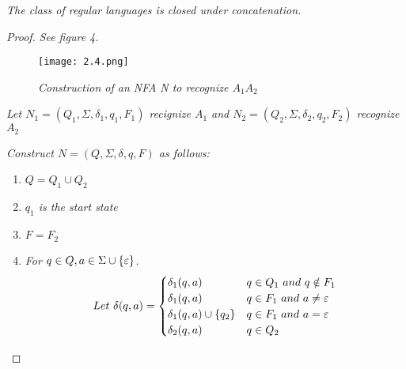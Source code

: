 \documentclass{article}
\begin{document}
\newpage
\setcounter{defn}{10}
\begin{thm}
    \textit{The class of regular languages is closed under concatenation.}
    \begin{proof}
        \textit{See figure 4.}
        \begin{figure}
            \centering
            \texttt{[image: 2.4.png]}
            \caption{\textit{Construction of an NFA N to recognize $A_1A_2$}}
        \end{figure}
        \textit{Let $N_1 = (Q_1,\Sigma,\delta_1,q_1,F_1)$ recignize $A_1$ and $N_2 = (Q_2,\Sigma,\delta_2,q_2,F_2)$ recognize $A_2$}

        \textit{Construct $N = (Q,\Sigma,\delta,q,F)$ as follows:}

        \begin{enumerate}
            \item $Q = Q_1\cup Q_2$
            \item \textit{$q_1$ is the start state}
            \item $F = F_2$
            \item \textit{For $q\in Q,a\in \Sigma\cup\{\varepsilon\}$.}
            \[ 
                Let ~ \delta(q,a) = 
                \begin{cases}
                    \delta_1(q,a) & q\in Q_1~and~q\notin F_1 \\
                    \delta_1(q,a) & q\in F_1~and~a\neq\varepsilon \\
                    \delta_1(q,a)\cup\{q_2\} & q\in F_1~and~a=\varepsilon \\
                    \delta_2(q,a) & q\in Q_2 \\
                \end{cases}
            \]
        \end{enumerate}
    \end{proof}
\end{thm}
\end{document}
